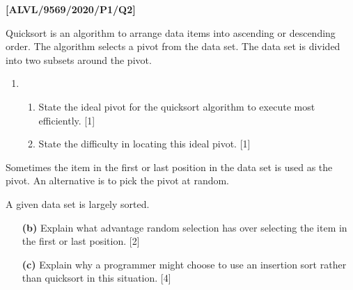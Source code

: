 \item \textbf{{[}ALVL/9569/2020/P1/Q2{]} }

Quicksort is an algorithm to arrange data items into ascending or
descending order. The algorithm selects a pivot from the data set.
The data set is divided into two subsets around the pivot.
\begin{enumerate}
\item {}
\begin{enumerate}
\item State the ideal pivot for the quicksort algorithm to execute most
efficiently. \hfill{}{[}1{]} 
\item State the difficulty in locating this ideal pivot. \hfill{}{[}1{]}
\end{enumerate}
\end{enumerate}
Sometimes the item in the first or last position in the data set is
used as the pivot. An alternative is to pick the pivot at random.

A given data set is largely sorted.
\begin{enumerate}
\item[\textbf{(b)}]  Explain what advantage random selection has over selecting the item
in the first or last position. \hfill{}{[}2{]}
\item[\textbf{(c)}]  Explain why a programmer might choose to use an insertion sort rather
than quicksort in this situation. \hfill{}{[}4{]}
\end{enumerate}